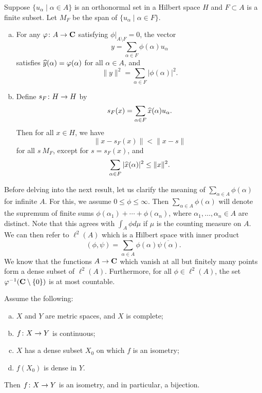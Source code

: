 \begin{theorem}
  Suppose $\{ u_\alpha \;|\; \alpha \in A \}$ is an orthonormal set in a Hilbert space $H$ and $F \subset A$ is a finite subset. Let $M_F$ be the span of $\{ u_\alpha \;|\; \alpha \in F \}$.
  \begin{enumerate}[(a)]
  \item For any $\varphi \colon A \rightarrow \mathbf{C}$ satisfying $\phi|_{A \setminus F} = 0$, the vector
    \[
    y = \sum_{\alpha \in F} \phi(\alpha) u_\alpha
    \]
    satisfies $\widehat{y}(\alpha) = \varphi(\alpha)$ for all $\alpha \in A$, and
    \[
    \|y\|^2 = \sum_{\alpha \in F} |\phi(\alpha)|^2.
    \]
  \item Define $s_F \colon H \rightarrow H$ by
    \[
    s_F(x) = \sum_{\alpha \in F} \widehat{x}(\alpha) u_\alpha.
    \]
    Then for all $x \in H$, we have
    \[
    \| x - s_F(x) \| < \| x - s \|
    \]
    for all $s \ M_F$, except for $s = s_F(x)$, and
    \[
    \sum_{\alpha \in F} |\widehat{x}(\alpha)|^2 \leq \|x\|^2.
    \]
  \end{enumerate}
\end{theorem}


Before delving into the next result, let us clarify the meaning of $\sum_{\alpha \in A} \phi(\alpha)$ for infinite $A$. For this, we assume $0 \leq \phi \leq \infty$.  Then $\sum_{\alpha \in A} \phi(\alpha)$ will denote the supremum of finite sums $\phi(\alpha_1) + \cdots + \phi(\alpha_n)$, where $\alpha_1, \dots, \alpha_n \in A$ are distinct. Note that this agrees with $\int_A \phi d\mu$ if $\mu$ is the counting measure on $A$. We can then refer to $\ell^2(A)$ which is a Hilbert space with inner product
\[
(\phi,\psi) = \sum_{\alpha \in A} \phi(\alpha) \overline{\psi(\alpha)}.
\]
We know that the functions $A \rightarrow \mathbf{C}$ which vanish at all but finitely many points form a dense subset of $\ell^2(A)$. Furthermore, for all $\phi \in \ell^2(A)$, the set $\varphi^{-1}(\mathbf{C} \setminus \{0\})$ is at most countable.

\begin{lemma}
  Assume the following:
  \begin{enumerate}[(a)]
  \item $X$ and $Y$ are metric spaces, and $X$ is complete;
  \item $f \colon X \rightarrow Y$ is continuous;
  \item $X$ has a dense subset $X_0$ on which $f$ is an isometry;
  \item $f(X_0)$ is dense in $Y$.
  \end{enumerate}
  Then $f \colon X \rightarrow Y$ is an isometry, and in particular, a bijection.
\end{lemma}

